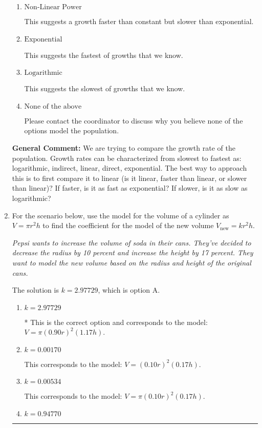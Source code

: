 \documentclass{extbook}[14pt]
\newcommand{\litem}[1]{\item #1

\rule{\textwidth}{0.4pt}}
\begin{document}
\begin{enumerate}
{\begin{enumerate}[label=\Alph*.]
This suggests a constant growth. You would be able to add or subtract the same amount year-to-year if this is the correct answer.
\item \( \text{Non-Linear Power} \)

This suggests a growth faster than constant but slower than exponential.
\item \( \text{Exponential} \)

This suggests the fastest of growths that we know.
\item \( \text{Logarithmic} \)

This suggests the slowest of growths that we know.
\item \( \text{None of the above} \)

Please contact the coordinator to discuss why you believe none of the options model the population.
\end{enumerate}

\textbf{General Comment:} We are trying to compare the growth rate of the population. Growth rates can be characterized from slowest to fastest as: logarithmic, indirect, linear, direct, exponential. The best way to approach this is to first compare it to linear (is it linear, faster than linear, or slower than linear)? If faster, is it as fast as exponential? If slower, is it as slow as logarithmic?
}
\litem{
For the scenario below, use the model for the volume of a cylinder as $V = \pi r^2 h$ to find the coefficient for the model of the new volume $V_{\text{new}} = k r^2 h$.

\begin{center}
    \textit{ Pepsi wants to increase the volume of soda in their cans. They've decided to decrease the radius by 10 percent and increase the height by 17 percent. They want to model the new volume based on the radius and height of the original cans. }
\end{center}
The solution is \( k = 2.97729 \), which is option A.\begin{enumerate}[label=\Alph*.]
\item \( k = 2.97729 \)

* This is the correct option and corresponds to the model: $V = \pi (0.90 r)^2 (1.17 h)$.
\item \( k = 0.00170 \)

This corresponds to the model: $V = (0.10 r)^2 (0.17 h)$.
\item \( k = 0.00534 \)

This corresponds to the model: $V = \pi (0.10 r)^2 (0.17 h)$.
\item \( k = 0.94770 \)


\end{enumerate}}
\end{enumerate}
\end{document}

